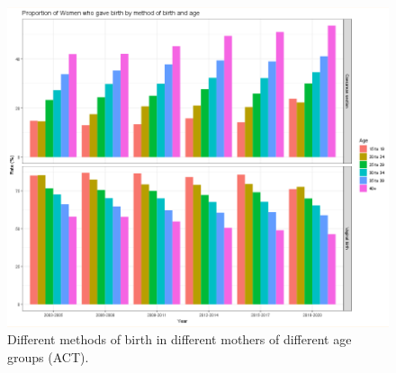 \begin{figure}
  \centering
  \includegraphics[width=1\textwidth]{subsections/method_of_birth/vagina_proportion.png}
  \caption{Different methods of birth in different mothers of different age groups (ACT).}
  \label{fig:vaginal_act}
\end{figure}